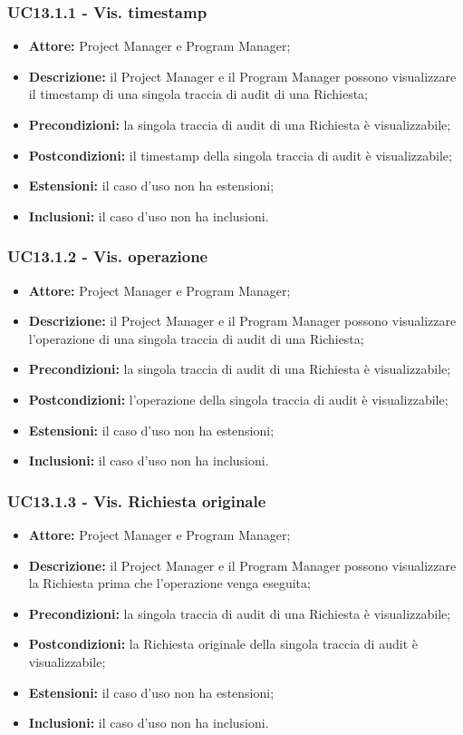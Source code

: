 \subsubsection*{UC13.1.1 - Vis. timestamp}
\begin{itemize}[label=$\circ$]
\item \textbf{Attore:} Project Manager e Program Manager;
\item \textbf{Descrizione:} il Project Manager e il Program Manager possono visualizzare il timestamp di una singola traccia di audit di una Richiesta;
\item \textbf{Precondizioni:} la singola traccia di audit di una Richiesta è visualizzabile;
\item \textbf{Postcondizioni:} il timestamp della singola traccia di audit è visualizzabile;
\item \textbf{Estensioni:} il caso d'uso non ha estensioni;
\item \textbf{Inclusioni:} il caso d'uso non ha inclusioni.
\end{itemize}

\subsubsection*{UC13.1.2 - Vis. operazione}
\begin{itemize}[label=$\circ$]
\item \textbf{Attore:} Project Manager e Program Manager;
\item \textbf{Descrizione:} il Project Manager e il Program Manager possono visualizzare l'operazione di una singola traccia di audit di una Richiesta;
\item \textbf{Precondizioni:} la singola traccia di audit di una Richiesta è visualizzabile;
\item \textbf{Postcondizioni:} l'operazione della singola traccia di audit è visualizzabile;
\item \textbf{Estensioni:} il caso d'uso non ha estensioni;
\item \textbf{Inclusioni:} il caso d'uso non ha inclusioni.
\end{itemize}

\subsubsection*{UC13.1.3 - Vis. Richiesta originale}
\begin{itemize}[label=$\circ$]
\item \textbf{Attore:} Project Manager e Program Manager;
\item \textbf{Descrizione:} il Project Manager e il Program Manager possono visualizzare la Richiesta prima che l'operazione venga eseguita;
\item \textbf{Precondizioni:} la singola traccia di audit di una Richiesta è visualizzabile;
\item \textbf{Postcondizioni:} la Richiesta originale della singola traccia di audit è visualizzabile;
\item \textbf{Estensioni:} il caso d'uso non ha estensioni;
\item \textbf{Inclusioni:} il caso d'uso non ha inclusioni.
\end{itemize}

